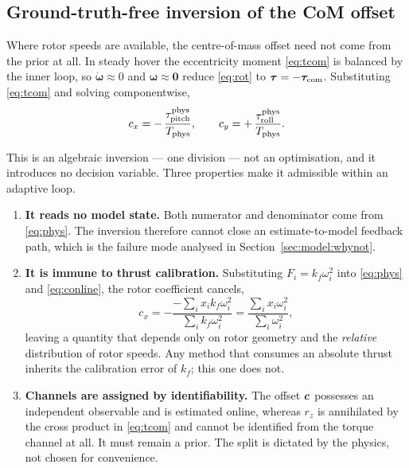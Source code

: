 \subsection{Ground-truth-free inversion of the CoM offset}\label{sec:model:conline}

Where rotor speeds are available, the centre-of-mass offset need not come
from the prior at all. In steady hover the eccentricity moment
\eqref{eq:tcom} is balanced by the inner loop, so
$\dot{\bm{\omega}} \approx 0$ and $\bm{\omega} \approx \bm{0}$ reduce
\eqref{eq:rot} to $\bm{\tau} = -\bm{\tau}_{\mathrm{com}}$. Substituting \eqref{eq:tcom} and
solving componentwise,
\begin{equation}
c_x = -\,\frac{\tau_{\mathrm{pitch}}^{\mathrm{phys}}}{T_{\mathrm{phys}}},
\qquad
c_y = +\,\frac{\tau_{\mathrm{roll}}^{\mathrm{phys}}}{T_{\mathrm{phys}}}.
\label{eq:conline}
\end{equation}

This is an algebraic inversion --- one division --- not an optimisation,
and it introduces no decision variable. Three properties make it
admissible within an adaptive loop.

\begin{enumerate}
\item \textbf{It reads no model state.} Both numerator and denominator
come from \eqref{eq:phys}. The inversion therefore cannot close an
estimate-to-model feedback path, which is the failure mode analysed in
Section~\ref{sec:model:whynot}.

\item \textbf{It is immune to thrust calibration.} Substituting
$F_i = k_f \omega_i^2$ into \eqref{eq:phys} and \eqref{eq:conline}, the
rotor coefficient cancels,
\begin{equation}
c_x = -\frac{-\sum_i x_i k_f \omega_i^2}{\sum_i k_f \omega_i^2}
    = \frac{\sum_i x_i \omega_i^2}{\sum_i \omega_i^2},
\label{eq:kfcancel}
\end{equation}
leaving a quantity that depends only on rotor geometry and the
\emph{relative} distribution of rotor speeds. Any method that consumes an
absolute thrust inherits the calibration error of $k_f$; this one does
not.

\item \textbf{Channels are assigned by identifiability.} The offset
$\bm{c}$ possesses an independent observable and is estimated online,
whereas $r_z$ is annihilated by the cross product in \eqref{eq:tcom} and
cannot be identified from the torque channel at all. It must remain a
prior. The split is dictated by the physics, not chosen for convenience.
\end{enumerate}


